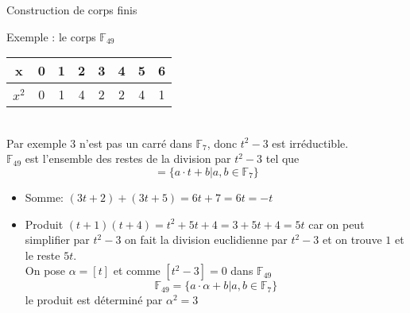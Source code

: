 \begin{parag}{Construction de corps finis}
\begin{subparag}{Exemple : le corps $\mathbb{F}_{49}$}
            \begin{tabular}{c||c|c|c|c|c|c|c|}
                x &0 & 1 & 2 & 3 & 4 & 5 & 6 \\
                \hline
                 $x^2$& 0 & 1 & 4 & 2 & 2 & 4 & 1 
            \end{tabular}
            \\
            Par exemple $3$ n'est pas un carré dans $\mathbb{F}_7$, donc $t^2-3$ est irréductible.
            \\
            $\mathbb{F}_{49}$ est l'ensemble des restes de la division par $t^2 - 3$ tel que
            \[ = \{a\cdot t + b | a, b \in \mathbb{F}_7\}\]
            \begin{itemize}
                \item Somme: $(3t + 2) + (3t + 5) = 6t + 7 = 6t = -t$
                \item Produit $(t+1)(t+4) = t^2 + 5t + 4 = 3 + 5t + 4 = 5t$ car on peut simplifier par $t^2 - 3$ on fait la division euclidienne par $t^2 - 3$ et on trouve $1$ et le reste $5t$.
                \\
                On pose $\alpha = [t]$ et comme $[t^2 - 3] = 0$ dans $\mathbb{F}_{49}$
                \[\mathbb{F}_{49} = \{a \cdot \alpha + b | a, b \in \mathbb{F}_7\}\]
                le produit est déterminé par $\alpha^2 = 3$
            \end{itemize}
    \end{subparag}
\end{parag}